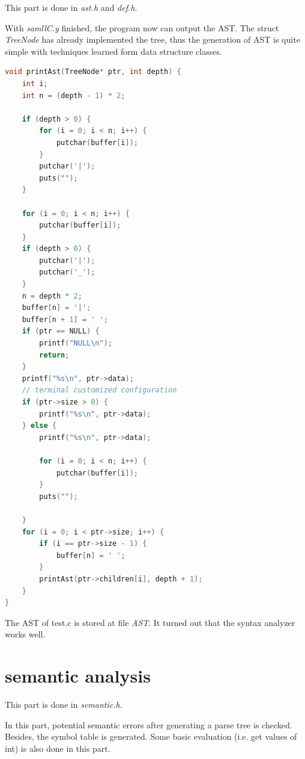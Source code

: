 \documentclass{article}
\begin{document}
This part is done in \textit{ast.h} and \textit{def.h}. 

With \textit{samllC.y} finished, the program now can output the AST. The struct \textit{TreeNode} has already implemented the tree, thus the generation of AST is quite simple with techniques learned form data structure classes.
\begin{lstlisting}[language = C] 
void printAst(TreeNode* ptr, int depth) {
    int i;
    int n = (depth - 1) * 2;
    
    if (depth > 0) {
        for (i = 0; i < n; i++) {
            putchar(buffer[i]);
        }
        putchar('|');
        puts("");
    }
    
    for (i = 0; i < n; i++) {
        putchar(buffer[i]);
    }
    if (depth > 0) {
        putchar('|');
        putchar('_');
    }
    n = depth * 2;
    buffer[n] = '|';
    buffer[n + 1] = ' ';
	if (ptr == NULL) {
		printf("NULL\n");
		return;
	}
    printf("%s\n", ptr->data);
    // terminal customized configuration
    if (ptr->size > 0) {
        printf("%s\n", ptr->data);
    } else {
        printf("%s\n", ptr->data);
        
        for (i = 0; i < n; i++) {
            putchar(buffer[i]);
        }
        puts("");
        
    }
    for (i = 0; i < ptr->size; i++) {
        if (i == ptr->size - 1) {
            buffer[n] = ' ';
        }
        printAst(ptr->children[i], depth + 1);
    }
}
\end{lstlisting}

The AST of test.c is stored at file \textit{AST}. It turned out that the syntax analyzer works well.



\section{semantic analysis}

This part is done in \textit{semantic.h}.

In this part, potential semantic errors after generating a parse tree is checked. Besides, the symbol table is generated. Some basic evaluation (i.e. get values of int) is also done in this part.
\end{document}
